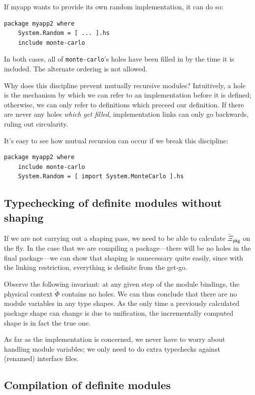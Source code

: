 \documentclass{article}
\begin{document}
If myapp wants to provide its own random implementation, it can do so:

\begin{verbatim}
package myapp2 where
    System.Random = [ ... ].hs
    include monte-carlo
\end{verbatim}

In both cases, all of \verb|monte-carlo|'s holes have been filled in by the time
it is included.  The alternate ordering is not allowed.

Why does this discipline prevent mutually recursive modules?  Intuitively,
a hole is the mechanism by which we can refer to an implementation
before it is defined; otherwise, we can only refer to definitions which
preceed our definition. If there are never any holes \emph{which get filled},
implementation links can only go backwards, ruling out circularity.

It's easy to see how mutual recursion can occur if we break this discipline:

\begin{verbatim}
package myapp2 where
    include monte-carlo
    System.Random = [ import System.MonteCarlo ].hs
\end{verbatim}

\subsection{Typechecking of definite modules without shaping}

If we are not carrying out a shaping pass, we need to be able to calculate
$\widetilde{\Xi}_{\mathsf{pkg}}$ on the fly.  In the case that we are
compiling a package---there will be no holes in the final package---we
can show that shaping is unnecessary quite easily, since with the
linking restriction, everything is definite from the get-go.

Observe the following invariant: at any given step of the module
bindings, the physical context $\widetilde{\Phi}$ contains no
holes.  We can thus conclude that there are no module variables in any
type shapes.  As the only time a previously calculated package shape can
change is due to unification, the incrementally computed shape is in
fact the true one.

As far as the implementation is concerned, we never have to worry
about handling module variables; we only need to do extra typechecks
against (renamed) interface files.

\subsection{Compilation of definite modules}\label{sec:compiling-definite}
\end{document}
